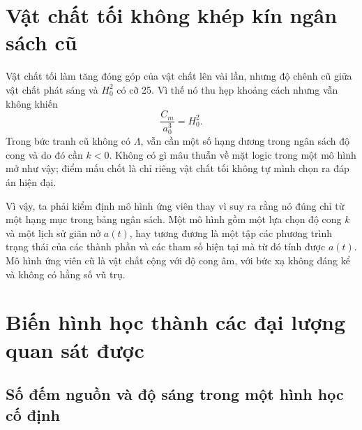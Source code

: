 \section{Vật chất tối không khép kín ngân sách cũ}

Vật chất tối làm tăng đóng góp của vật chất lên vài lần, nhưng độ chênh cũ giữa vật chất phát sáng và \(H_0^2\) có cỡ 25. Vì thế nó thu hẹp khoảng cách nhưng vẫn không khiến
\begin{equation}
\frac{C_m}{a_0^3}=H_0^2.
\end{equation}
Trong bức tranh cũ không có \(\Lambda\), vẫn cần một số hạng dương trong ngân sách độ cong và do đó cần \(k<0\). Không có gì mâu thuẫn về mặt logic trong một mô hình mở như vậy; điểm mấu chốt là chỉ riêng vật chất tối không tự mình chọn ra đáp án hiện đại.

\begin{classroomqa}
\end{classroomqa}

Vì vậy, ta phải kiểm định mô hình ứng viên thay vì suy ra rằng nó đúng chỉ từ một hạng mục trong bảng ngân sách. Một mô hình gồm một lựa chọn độ cong \(k\) và một lịch sử giãn nở \(a(t)\), hay tương đương là một tập các phương trình trạng thái của các thành phần và các tham số hiện tại mà từ đó tính được \(a(t)\). Mô hình ứng viên cũ là vật chất cộng với độ cong âm, với bức xạ không đáng kể và không có hằng số vũ trụ.

\section{Biến hình học thành các đại lượng quan sát được}

\subsection{Số đếm nguồn và độ sáng trong một hình học cố định}


